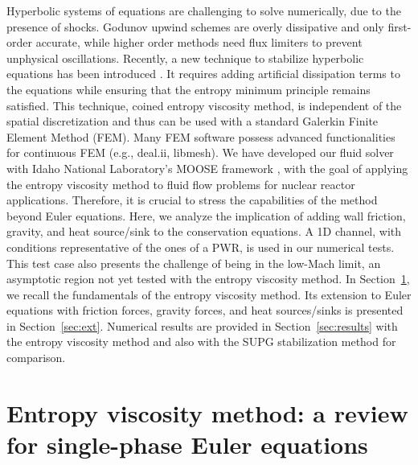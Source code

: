 \documentclass[12pt]{article}
\begin{document}
Hyperbolic systems of equations are challenging to solve numerically, due to the presence of shocks. Godunov upwind schemes are overly
dissipative and only first-order accurate, while higher order methods need flux  limiters to prevent unphysical oscillations. Recently,
a new technique to stabilize hyperbolic equations has been introduced \cite{valentin, jlg1, jlg2} . 
It requires adding artificial dissipation terms to the equations while ensuring that the entropy minimum principle remains satisfied. 
This technique, coined entropy viscosity method, is independent of the spatial discretization and thus can be used with a standard 
Galerkin Finite Element Method (FEM). Many FEM software possess advanced functionalities for continuous FEM (e.g., deal.ii, libmesh).
We have developed our fluid solver with Idaho National Laboratory's MOOSE framework \cite{Moose}, with the goal of applying the entropy 
viscosity method to fluid flow problems for nuclear reactor applications. Therefore, it is crucial to stress the capabilities of the method
beyond Euler equations. Here, we analyze the implication of adding wall friction, gravity, and heat source/sink to the conservation equations.
A 1D channel, with conditions representative of the ones of a PWR, is used in our numerical tests. This test case also presents the challenge
of being in the low-Mach limit, an asymptotic region not yet tested with the entropy viscosity method. In Section~\ref{sec:section1}, we recall
the fundamentals of the entropy viscosity method.  Its extension to Euler equations with friction forces, gravity forces, and heat sources/sinks is presented in Section~\ref{sec:ext}. Numerical results are provided in Section~\ref{sec:results} with the entropy viscosity method and also with the SUPG stabilization method  \cite{SUPG} for comparison.


%
\section{Entropy viscosity method: a review for single-phase Euler equations}
\label{sec:section1}
\end{document}
